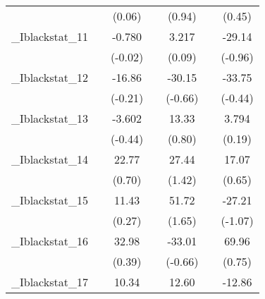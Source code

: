 {\begin{tabular}{l*{6}{c}}
            &                     &      (0.06)         &                     &      (0.94)         &                     &      (0.45)         \\
[1em]
\_Iblackstat\_11&                     &      -0.780         &                     &       3.217         &                     &      -29.14         \\
            &                     &     (-0.02)         &                     &      (0.09)         &                     &     (-0.96)         \\
[1em]
\_Iblackstat\_12&                     &      -16.86         &                     &      -30.15         &                     &      -33.75         \\
            &                     &     (-0.21)         &                     &     (-0.66)         &                     &     (-0.44)         \\
[1em]
\_Iblackstat\_13&                     &      -3.602         &                     &       13.33         &                     &       3.794         \\
            &                     &     (-0.44)         &                     &      (0.80)         &                     &      (0.19)         \\
[1em]
\_Iblackstat\_14&                     &       22.77         &                     &       27.44         &                     &       17.07         \\
            &                     &      (0.70)         &                     &      (1.42)         &                     &      (0.65)         \\
[1em]
\_Iblackstat\_15&                     &       11.43         &                     &       51.72         &                     &      -27.21         \\
            &                     &      (0.27)         &                     &      (1.65)         &                     &     (-1.07)         \\
[1em]
\_Iblackstat\_16&                     &       32.98         &                     &      -33.01         &                     &       69.96         \\
            &                     &      (0.39)         &                     &     (-0.66)         &                     &      (0.75)         \\
[1em]
\_Iblackstat\_17&                     &       10.34         &                     &       12.60         &                     &      -12.86         \\

\end{tabular}}
